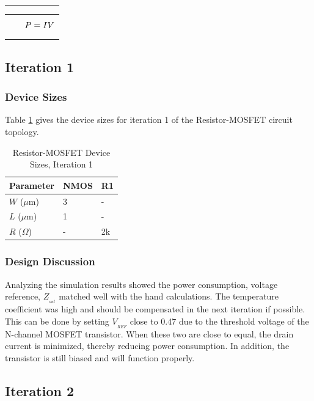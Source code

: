\documentclass[conference]{IEEEtran}
\begin{document}
\begin{table}[!htbp]
\begin{tabular}{|m{1.5cm}|m{6.5cm}|}
\begin{multline}
    \end{multline}\\
    \hline
	\pbox{1.5cm}{{\small Power Consumption}} &
    \begin{equation}
      \label{rm-P}
      \mathsmaller{P = IV}
    \end{equation}\\
    \hline
  \end{tabular}
\end{table}

\subsection{Iteration 1}
\subsubsection{Device Sizes}
Table \ref{tab:rm-ds-1} gives the device sizes for iteration 1 of the Resistor-MOSFET circuit topology.
\begin{table}[!htbp]
  \caption[]{Resistor-MOSFET Device Sizes, Iteration 1}
  \label{tab:rm-ds-1}
  \centering
  \begin{tabular}{|l|l|l|}
    \hline
    Parameter			& NMOS	&R1 \\ \hline
    $W$ ($\mu$m)		&3		&-\\ 
    $L$ ($\mu$m)		& 1		&-\\
    $R$ ($\Omega$)		&-		&2k\\
    \hline
  \end{tabular}
\end{table}
\subsubsection{Design Discussion}
Analyzing the simulation results showed the power consumption, voltage reference, $Z_{_{out}}$ matched well with the hand calculations.  The temperature coefficient was high and should be compensated in the next iteration if possible.  This can be done by setting $V_{_{REF}}$ close to 0.47 due to the threshold voltage of the N-channel MOSFET transistor.  When these two are close to equal, the drain current is minimized, thereby reducing power consumption.  In addition, the transistor is still biased and will function properly.
\subsection{Iteration 2}
\end{document}
